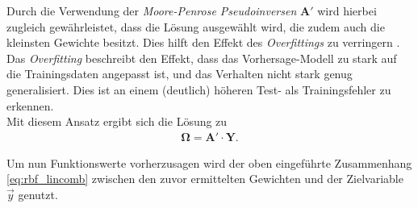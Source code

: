 Durch die Verwendung der \textit{Moore-Penrose Pseudoinversen} $\mathbf{A}'$ wird hierbei zugleich gewährleistet, dass die Lösung ausgewählt wird, die zudem auch die kleinsten Gewichte besitzt. Dies hilft den Effekt des \textit{Overfittings} zu verringern \cite{lowe2multi}. Das \textit{Overfitting} beschreibt den Effekt, dass das Vorhersage-Modell zu stark auf die Trainingsdaten angepasst ist, und das Verhalten nicht stark genug generalisiert. Dies ist an einem (deutlich) höheren Test- als Trainingsfehler zu erkennen.\\

Mit diesem Ansatz ergibt sich die Lösung zu
\begin{align}
\mathbf{\Omega} = \mathbf{A}' \cdot \mathbf{Y}.
\end{align}

Um nun Funktionswerte vorherzusagen wird der oben eingeführte Zusammenhang \ref{eq:rbf_lincomb} zwischen den zuvor ermittelten Gewichten und der Zielvariable $\vec{y}$ genutzt.